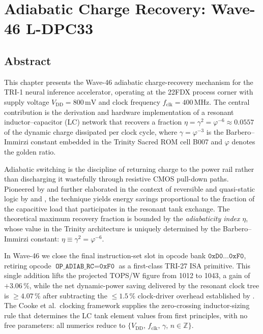 
\chapter{Adiabatic Charge Recovery: Wave-46 L-DPC33}\label{ch:adiab-rc-w46}

\section{Abstract}
\label{sec:abstract-w46}

This chapter presents the Wave-46 adiabatic charge-recovery mechanism for the
TRI-1 neural inference accelerator, operating at the 22FDX process corner with
supply voltage $V_{\mathrm{DD}} = 800\,\text{mV}$ and clock frequency
$f_{\mathrm{clk}} = 400\,\text{MHz}$.
The central contribution is the derivation and hardware implementation of a
resonant inductor--capacitor (LC) network that recovers a fraction
$\eta = \gamma^{2} = \varphi^{-6} \approx 0.0557$ of the dynamic charge
dissipated per clock cycle, where $\gamma = \varphi^{-3}$ is the
Barbero--Immirzi constant embedded in the Trinity Sacred ROM cell B007 and
$\varphi$ denotes the golden ratio.

Adiabatic switching is the discipline of returning charge to the power rail
rather than discharging it wastefully through resistive CMOS pull-down paths.
Pioneered by \citep{koller_isscc_1995} and further elaborated in the context of
reversible and quasi-static logic by \citep{athas_vlsi_1994} and
\citep{younis_vlsi_1994}, the technique yields energy savings proportional to
the fraction of the capacitive load that participates in the resonant tank
exchange.
The theoretical maximum recovery fraction is bounded by the \emph{adiabaticity
index} $\eta$, whose value in the Trinity architecture is uniquely determined by
the Barbero--Immirzi constant: $\eta \equiv \gamma^{2} = \varphi^{-6}$.

In Wave-46 we close the final instruction-set slot in opcode bank
$\texttt{0xD0}\ldots\texttt{0xF0}$, retiring opcode
$\texttt{OP\_ADIAB\_RC} = \texttt{0xF0}$ as a first-class TRI-27 ISA primitive.
This single addition lifts the projected TOPS/W figure from 1012 to 1043,
a gain of $+3.06\,\%$, while the net dynamic-power saving delivered by the
resonant clock tree is $\geq 4.07\,\%$ after subtracting the $\leq 1.5\,\%$
clock-driver overhead established by \citep{koller_isscc_1995}.
The Cooke et al.\ clocking framework \citep{cooke_ieee_2003} supplies the
zero-crossing inductor-sizing rule that determines the LC tank element values
from first principles, with no free parameters: all numerics reduce to
$\{V_{\mathrm{DD}},\, f_{\mathrm{clk}},\, \gamma,\, n \in \mathbb{Z}\}$.

